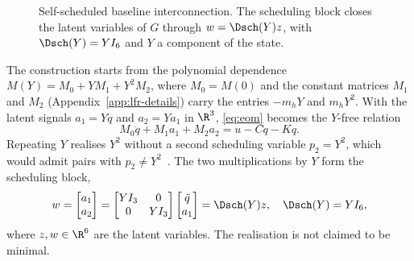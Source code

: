 \begin{figure}[t]
  \centering
  
  \caption{Self-scheduled baseline interconnection. The scheduling block closes
  the latent variables of $G$ through $w=\Dsch(Y)z$, with $\Dsch(Y)=YI_6$ and
  $Y$ a component of the state.}
  \label{fig:lfr}
\end{figure}

The construction starts from the polynomial dependence
$M(Y)=M_0+YM_1+Y^2M_2$, where $M_0=M(0)$ and the constant matrices $M_1$ and
$M_2$ (Appendix~\ref{app:lfr-details}) carry the entries $-m_hY$ and $m_hY^2$.
With the latent signals $a_1=Y\ddot q$ and $a_2=Ya_1$ in $\R^3$,
\eqref{eq:eom} becomes the $Y$-free relation
\begin{equation}
  M_0\ddot q+M_1a_1+M_2a_2=u-C\dot q-Kq.
  \label{eq:lfr_constant}
\end{equation}
Repeating $Y$ realises $Y^2$ without a second scheduling variable $p_2=Y^2$,
which would admit pairs with $p_2\neq Y^2$~\cite[Sec.~2.1.1]{drenth2025thesis}.
The two multiplications by $Y$ form the scheduling block,
\begin{equation}
  w=\begin{bmatrix}a_1\\a_2\end{bmatrix}
   =\begin{bmatrix}YI_3&0\\0&YI_3\end{bmatrix}
    \begin{bmatrix}\ddot q\\a_1\end{bmatrix}
   =\Dsch(Y)z,\quad \Dsch(Y)=YI_6,
  \label{eq:delta}
\end{equation}
where $z,w\in\R^6$ are the latent variables.
The realisation is not claimed to be minimal.

